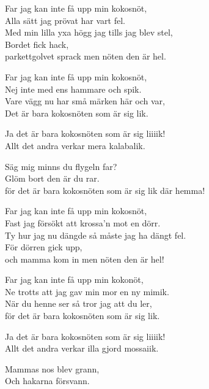\vspace{10pt}
Far jag kan inte få upp min kokosnöt,\\
Alla sätt jag prövat har vart fel.\\
Med min lilla yxa högg jag tills jag blev stel,\\
Bordet fick hack,\\
parkettgolvet sprack men nöten den är hel.\par
\vspace{10pt}
Far jag kan inte få upp min kokosnöt,\\
Nej inte med ens hammare och spik.\\
Vare vägg nu har små märken här och var,\\
Det är bara kokosnöten som är sig lik.\par
\vspace{10pt}
Ja det är bara kokosnöten som är sig liiiik!\\
Allt det andra verkar mera kalabalik.\par
\vspace{10pt}
Säg mig minns du flygeln far?\\
Glöm bort den är du rar.\\
för det är bara kokosnöten som är sig lik där hemma!\par
\vspace{10pt}
Far jag kan inte få upp min kokosnöt,\\
Fast jag försökt att krossa'n mot en dörr.\\
Ty hur jag nu dängde så måste jag ha dängt fel.\\
För dörren gick upp,\\
och mamma kom in men nöten den är hel!\par
\vspace{10pt}
Far jag kan inte få upp min kokonöt,\\
Ne trotts att jag gav min mor en ny mimik.\\
När du henne ser så tror jag att du ler,\\
för det är bara kokosnöten som är sig lik.\par
\vspace{10pt}
Ja det är bara kokosnöten som är sig liiiik!\\
Allt det andra verkar illa gjord mossaiik.\par
\vspace{10pt}
Mammas nos blev grann,\\
Och hakarna försvann.\\
